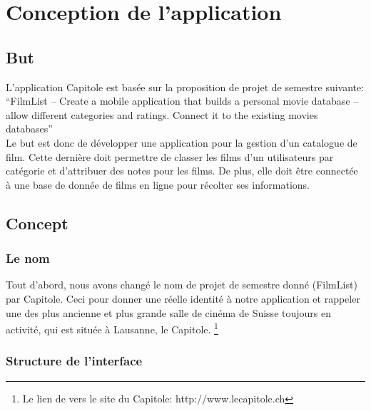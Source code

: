 \chapter{Conception de l'application}



\section{But}

L'application Capitole est basée sur la proposition de projet de semestre suivante:\\

``FilmList – Create a mobile application that builds a personal movie database – allow different categories and ratings. Connect it to the existing movies databases''\\

Le but est donc de développer une application pour la gestion d'un catalogue de film. Cette dernière doit permettre de classer les films d'un utilisateurs par catégorie et d'attribuer des notes pour les films. De plus, elle doit être connectée à une base de donnée de films en ligne pour récolter ses informations.


\section{Concept}

\subsection*{Le nom}
Tout d'abord, nous avons changé le nom de projet de semestre donné (FilmList) par Capitole. Ceci pour donner une réelle identité à notre application et rappeler une des plus ancienne et plus grande salle de cinéma de Suisse toujours en activité, qui est située à Lausanne, le Capitole. \footnote{Le lien de vers le site du Capitole: http://www.lecapitole.ch}

\subsection*{Structure de l'interface}

